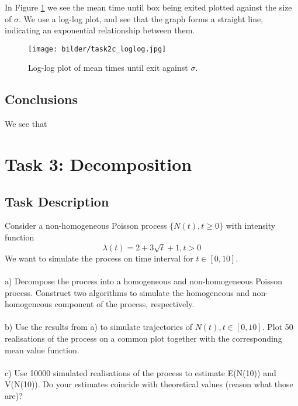 In Figure \ref{fig:2c} we see the mean time until box being exited plotted against the size of $\sigma$. We use a log-log plot, and see that the graph forms a straight line, indicating an exponential relationship between them.

\begin{figure}[H]
    \centering
    \texttt{[image: bilder/task2c\_loglog.jpg]}
    \caption{Log-log plot of mean times until exit against $\sigma$.}
    \label{fig:2c}
\end{figure}

\subsection{Conclusions}
\label{sec:conc2}


We see that 

\newpage
\section{Task 3: Decomposition}
\label{sec:task3}

\subsection{Task Description}
Consider a non-homogeneous Poisson process $\{N(t), t \geq 0\}$ with intensity function
\begin{equation}
\lambda(t) = 2 + 3\sqrt{t} + 1 , t > 0
\end{equation}
\label{eq:task3Intensity}
We want to simulate the process on time interval for $t\in[0, 10]$.\\\\
a) Decompose the process into a homogeneous and non-homogeneous Poisson process. Construct two algorithms to simulate the homogeneous and non-homogeneous component of the process, respectively.\\\\
b) Use the results from a) to simulate trajectories of ${N(t), t \in[0, 10]}$. Plot 50 realisations of the process
on a common plot together with the corresponding mean value function.\\\\
c) Use 10000 simulated realisations of the process to estimate E(N(10)) and V(N(10)). Do your estimates coincide with theoretical values (reason what those are)?
\label{sec:desc3}

